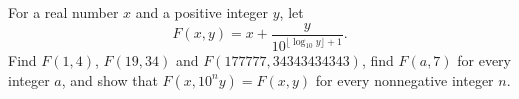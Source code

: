 For a real number $x$ and a positive integer $y$, let
\[
F(x,y)=x+\dfrac{y}{10^{\lfloor\log_{10}y\rfloor+1}} .
\]
Find $F(1,4)$, $F(19,34)$ and $F(177777,34343434343)$, find $F(a,7)$ for every integer $a$, and show that $F(x,10^ny)=F(x,y)$ for every nonnegative integer $n$.
